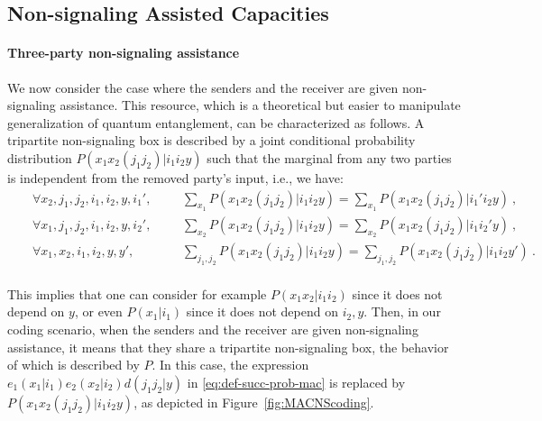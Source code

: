 \subsection{Non-signaling Assisted Capacities}
\paragraph{Three-party non-signaling assistance} We now consider the case where the senders and the receiver are given non-signaling assistance. This resource, which is a theoretical but easier to manipulate generalization of quantum entanglement, can be characterized as follows. A tripartite non-signaling box is described by a joint conditional probability distribution $P(x_1x_2(j_1j_2)|i_1i_2y)$ such that the marginal from any two parties is independent from the removed party's input, i.e., we have:
\begin{equation}
  \begin{aligned}
    &&\forall x_2,j_1,j_2,i_1,i_2,y,i_1', &&&\sum_{x_1} P(x_1x_2(j_1j_2)|i_1i_2y) = \sum_{x_1} P(x_1x_2(j_1j_2)|i_1'i_2y) \ ,\\
    &&\forall x_1,j_1,j_2,i_1,i_2,y,i_2', &&&\sum_{x_2} P(x_1x_2(j_1j_2)|i_1i_2y) = \sum_{x_2} P(x_1x_2(j_1j_2)|i_1i_2'y) \ ,\\
    &&\forall x_1,x_2,i_1,i_2,y,y', &&&\sum_{j_1,j_2} P(x_1x_2(j_1j_2)|i_1i_2y) = \sum_{j_1,j_2} P(x_1x_2(j_1j_2)|i_1i_2y') \ .\\
  \end{aligned}
\end{equation}

This implies that one can consider for example $P(x_1x_2|i_1i_2)$ since it does not depend on $y$, or even $P(x_1|i_1)$ since it does not depend on $i_2,y$. Then, in our coding scenario, when the senders and the receiver are given non-signaling assistance, it means that they share a tripartite non-signaling box, the behavior of which is described by $P$. In this case, the expression $e_1(x_1|i_1)e_2(x_2|i_2)d(j_1j_2|y)$ in \eqref{eq:def-succ-prob-mac} is replaced by $P(x_1x_2(j_1j_2)|i_1i_2y)$, as depicted in Figure~\ref{fig:MACNScoding}.

